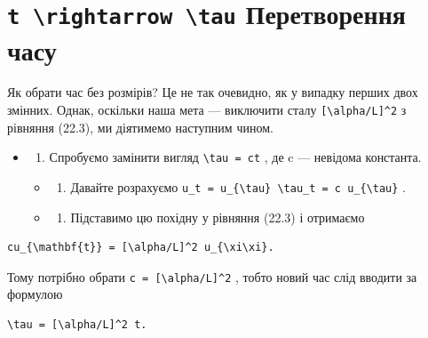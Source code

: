 \documentclass[
  ukrainian,
]{article}
\providecommand{\tightlist}{%
  \setlength{\itemsep}{0pt}\setlength{\parskip}{0pt}}
\begin{document}
\section{\texorpdfstring{\texttt{t\ \textbackslash{}rightarrow\ \textbackslash{}tau}
Перетворення
часу}{t \textbackslash rightarrow \textbackslash tau Перетворення часу}}\label{t-rightarrow-tau-ux43fux435ux440ux435ux442ux432ux43eux440ux435ux43dux43dux44f-ux447ux430ux441ux443}

Як обрати час без розмірів? Це не так очевидно, як у випадку перших двох
змінних. Однак, оскільки наша мета --- виключити сталу
\texttt{{[}\textbackslash{}alpha/L{]}\^{}2} з рівняння (22.3), ми
діятимемо наступним чином.

\begin{itemize}
\item
  \begin{enumerate}
  \def\labelenumi{\arabic{enumi}.}
  \tightlist
  \item
    Спробуємо замінити вигляд \texttt{\textbackslash{}tau\ =\ ct} , де c
    --- невідома константа.
  \end{enumerate}

  \begin{itemize}
  \tightlist
  \item
    \begin{enumerate}
    \def\labelenumi{\arabic{enumi}.}
    \setcounter{enumi}{1}
    \tightlist
    \item
      Давайте розрахуємо
      \texttt{u\_t\ =\ u\_\{\textbackslash{}tau\}\ \textbackslash{}tau\_t\ =\ c\ u\_\{\textbackslash{}tau\}}
      .
    \end{enumerate}
  \item
    \begin{enumerate}
    \def\labelenumi{\arabic{enumi}.}
    \setcounter{enumi}{2}
    \tightlist
    \item
      Підставимо цю похідну у рівняння (22.3) і отримаємо
    \end{enumerate}
  \end{itemize}
\end{itemize}

\begin{verbatim}
cu_{\mathbf{t}} = [\alpha/L]^2 u_{\xi\xi}.
\end{verbatim}

Тому потрібно обрати \texttt{c\ =\ {[}\textbackslash{}alpha/L{]}\^{}2} ,
тобто новий час слід вводити за формулою

\begin{verbatim}
\tau = [\alpha/L]^2 t.
\end{verbatim}
\end{document}
